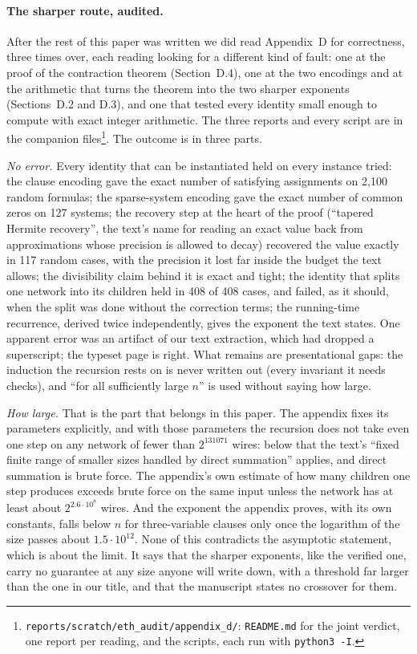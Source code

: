 \paragraph{The sharper route, audited.}
After the rest of this paper was written we did read Appendix~D for
correctness, three times over, each reading looking for a different kind
of fault: one at the proof of the contraction theorem (Section~D.4), one
at the two encodings and at the arithmetic that turns the theorem into
the two sharper exponents (Sections~D.2 and D.3), and one that tested
every identity small enough to compute with exact integer arithmetic.
The three reports and every script are in the companion
files\footnote{\texttt{reports/scratch/eth\_audit/appendix\_d/}:
\texttt{README.md} for the joint verdict, one report per reading, and the
scripts, each run with \texttt{python3 -I}.}. The outcome is in three
parts.

\emph{No error.} Every identity that can be instantiated held on every
instance tried: the clause encoding gave the exact number of satisfying
assignments on 2,100 random formulas; the sparse-system encoding gave the
exact number of common zeros on 127 systems; the recovery step at the
heart of the proof (``tapered Hermite recovery'', the text's name for
reading an exact value back from approximations whose precision is
allowed to decay) recovered the value exactly in 117 random cases, with
the precision it lost far inside the budget the text allows; the
divisibility claim behind it is exact and tight; the identity that splits
one network into its children held in 408 of 408 cases, and failed, as it
should, when the split was done without the correction terms; the
running-time recurrence, derived twice independently, gives the exponent
the text states. One apparent error was an artifact of our text
extraction, which had dropped a superscript; the typeset page is right.
What remains are presentational gaps: the induction the recursion rests
on is never written out (every invariant it needs checks), and ``for all
sufficiently large $n$'' is used without saying how large.

\emph{How large.} That is the part that belongs in this paper. The
appendix fixes its parameters explicitly, and with those parameters the
recursion does not take even one step on any network of fewer than
$2^{131071}$ wires: below that the text's ``fixed finite range of smaller
sizes handled by direct summation'' applies, and direct summation is
brute force. The appendix's own estimate of how many children one step
produces exceeds brute force on the same input unless the network has at
least about $2^{2.6\cdot 10^{8}}$ wires. And the exponent the appendix
proves, with its own constants, falls below $n$ for three-variable
clauses only once the logarithm of the size passes about
$1.5\cdot 10^{12}$. None of this contradicts the asymptotic statement,
which is about the limit. It says that the sharper exponents, like the
verified one, carry no guarantee at any size anyone will write down, with
a threshold far larger than the one in our title, and that the
manuscript states no crossover for them.

